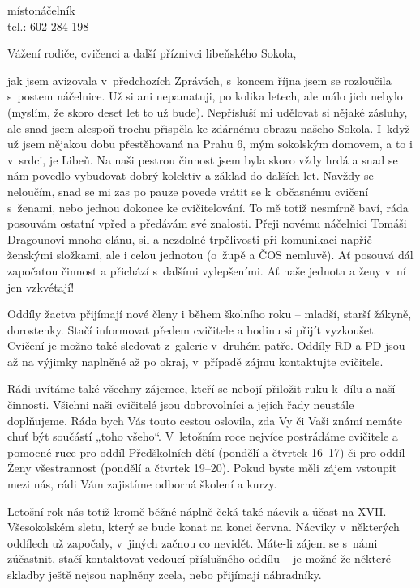 \documentclass[11pt]{article}
\begin{document}
\signature{Jiří Novák (Jirkan)}{místonáčelník\\tel.: 602 284 198}

\clearpage
{}
Vážení rodiče, cvičenci a další příznivci libeňského Sokola,

jak jsem avizovala v~předchozích Zprávách, s~koncem října jsem se rozloučila s~postem náčelnice. Už si ani nepamatuji, po kolika letech, ale málo jich nebylo (myslím, že skoro deset let to už bude). Nepřísluší mi udělovat si nějaké zásluhy, ale snad jsem alespoň trochu přispěla ke zdárnému obrazu našeho Sokola. I~když už jsem nějakou dobu přestěhovaná na Prahu 6, mým sokolským domovem, a to i v~srdci, je Libeň. Na naši pestrou činnost jsem byla skoro vždy hrdá a snad se nám povedlo vybudovat dobrý kolektiv a základ do dalších let. Navždy se neloučím, snad se mi zas po pauze povede vrátit se k~občasnému cvičení s~ženami, nebo jednou dokonce ke cvičitelování. To mě totiž nesmírně baví, ráda posouvám ostatní vpřed a předávám své znalosti.
Přeji novému náčelnici Tomáši Dragounovi mnoho elánu, sil a nezdolné trpělivosti při komunikaci napříč ženskými složkami, ale i celou jednotou (o~župě a ČOS nemluvě). Ať posouvá dál započatou činnost a přichází s~dalšími vylepšeními. Ať naše jednota a ženy v~ní jen vzkvétají!

\vspace*{12pt}
\noindent
Oddíly žactva přijímají nové členy i během školního roku – mladší, starší žákyně, dorostenky. Stačí informovat předem cvičitele a hodinu si přijít vyzkoušet. Cvičení je možno také sledovat z~galerie v~druhém patře. Oddíly RD a PD jsou až na výjimky naplněné až po okraj, v~případě zájmu kontaktujte cvičitele.

Rádi uvítáme také všechny zájemce, kteří se nebojí přiložit ruku k~dílu a naší činnosti. Všichni naši cvičitelé jsou dobrovolníci a jejich řady neustále doplňujeme. Ráda bych Vás touto cestou oslovila, zda Vy či Vaši známí nemáte chuť být součástí „toho všeho“. V~letošním roce nejvíce postrádáme cvičitele a pomocné ruce pro oddíl Předškolních dětí (pondělí a čtvrtek 16–17) či pro oddíl Ženy všestrannost (pondělí a čtvrtek 19–20). Pokud byste měli zájem vstoupit mezi nás, rádi Vám zajistíme odborná školení a kurzy.

Letošní rok nás totiž kromě běžné náplně čeká také nácvik a účast na XVII. Všesokolském sletu, který se bude konat na konci června. Nácviky v~některých oddílech už započaly, v~jiných začnou co nevidět. Máte-li zájem se s~námi zúčastnit, stačí kontaktovat vedoucí příslušného oddílu – je možné že některé skladby ještě nejsou naplněny zcela, nebo přijímají náhradníky.
\end{document}

